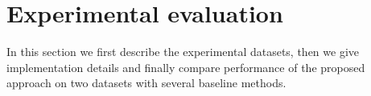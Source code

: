 \documentclass[table]{article} %
\begin{document}








\section{Experimental evaluation}
\label{sec:exp}
	In this section we first describe the experimental datasets, then we give implementation details and finally compare performance of the proposed approach on two datasets with several baseline methods.
\end{document}
